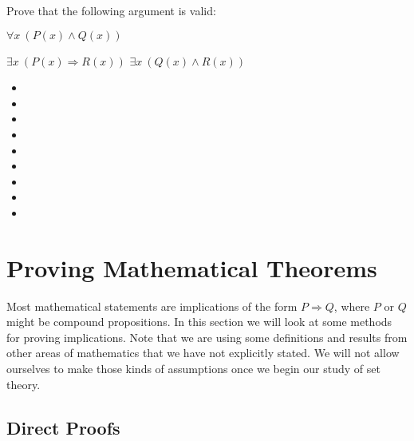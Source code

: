 \begin{example}\label{ex:quantified}
Prove that the following argument is valid:
{\setlength\linwid{1.4in}
\begin{centeredarg}
\item $\forall x\ (P(x)\land Q(x))$
\item $\exists x\ (P(x)\Rightarrow R(x))$
\hence $\exists x\ (Q(x)\land R(x))$
\end{centeredarg}}
{\setlength{}
\begin{itemize}\itemsep0pt\itemindent-2em
\item[] 
\item[] 
\item[] 
\item[] 
\item[] 
\item[] 
\item[] 
\item[] 
\item[] 
\end{itemize}}
\end{example}

\section{Proving Mathematical Theorems}

Most mathematical statements are implications of the form $P\Rightarrow Q$, where $P$ or $Q$ might be compound propositions. In this section we will look at some methods for proving implications. Note that we are using some definitions and results from other areas of mathematics that we have not explicitly stated. We will not allow ourselves to make those kinds of assumptions once we begin our study of set theory.

\subsection{Direct Proofs}

